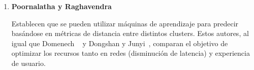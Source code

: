 \begin{enumerate}
  \item \textbf{Poornalatha y Raghavendra~\cite{Poornalatha2012}}
  
	{ 
		
	  Establecen que se pueden utilizar máquinas de aprendizaje para predecir basándose en métricas de distancia entre distintos clusters. Estos autores, al igual que Domenech \etal~\cite{Domenech2006} y Dongshan y Junyi~\cite{Dongshan2002}, comparan el objetivo de optimizar los recursos tanto en redes (disminución de latencia) y experiencia de usuario.
	  }
  
  
\end{enumerate}

